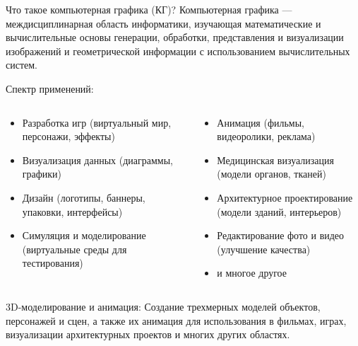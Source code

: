 \documentclass{beamer}
\begin{document}
	\begin{frame}{Что такое компьютерная графика (КГ)?}
		Компьютерная графика --- междисциплинарная область информатики, изучающая математические и вычислительные основы генерации, обработки, представления и визуализации изображений и геометрической информации с использованием вычислительных систем.

		{
			Спектр применений:
			\vskip-4mm
			\begin{columns}[t]
				\begin{column}{0.48\textwidth}
					{\footnotesize
						\begin{itemize}
							\item Разработка игр (виртуальный мир, персонажи, эффекты)
							\item Визуализация данных (диаграммы, графики)
							\item Дизайн (логотипы, баннеры, упаковки, интерфейсы)
							\item Симуляция и моделирование (виртуальные среды для тестирования)
						\end{itemize}
					}
				\end{column}
				\begin{column}{0.48\textwidth}
					{\footnotesize
						\begin{itemize}
							\item Анимация (фильмы, видеоролики, реклама)
							\item Медицинская визуализация (модели органов, тканей)
							\item Архитектурное проектирование (модели зданий, интерьеров)
							\item Редактирование фото и видео (улучшение качества)
							\item и многое другое
						\end{itemize}
					}
				\end{column}
			\end{columns}
		}
		
		3D-моделирование и анимация: Создание трехмерных моделей объектов, персонажей и сцен, а также их анимация для использования в фильмах, играх, визуализации архитектурных проектов и многих других областях.
		

\end{frame}
\end{document}
